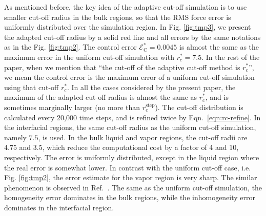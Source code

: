 \documentclass[preprint]{revtex4}
\begin{document}
As mentioned before, the key idea of the adaptive cut-off simulation
is to use smaller cut-off
radius in the bulk regions, so that the RMS force error is uniformly
distributed over the simulation region. In Fig. \ref{fig:tmp3}, we
present the adapted cut-off radius by a solid red line and all errors
by the same notations as in the Fig. \ref{fig:tmp2}. The control error
$\mathcal E^\ast_{\textrm{C}} = 0.0045$ is almost the same as the maximum
error in the uniform cut-off simulation with $r_c^\ast=7.5$.
{
  In the rest of the paper, when we mention that ``the cut-off of
  the adaptive cut-off method is $r_c^\ast$'', we mean the
  control error is the maximum error of a uniform cut-off simulation
  using that cut-off $r_c^\ast$. In all the cases considered by
  the present paper, the maximum of
  the adapted cut-off radius is almost the same as $r_c^\ast$,
  and is sometimes marginally larger (no more than $r_c^\textrm{step}$).
}
The
cut-off distribution is calculated every 20,000 time steps, and is
refined twice by Eqn.~\eqref{eqn:rc-refine}. In the interfacial
regions, the same cut-off radius as the uniform cut-off simulation,
namely $7.5$, is used.  In the bulk
liquid and vapor regions, the cut-off radii are $4.75$ and $3.5$,
which reduce the computational cost
by a factor of 4 and 10, respectively.
The error is uniformly distributed, except in the
liquid region where the real error is somewhat lower.
In contrast with the uniform
cut-off case, i.e. Fig. \ref{fig:tmp2}, the error estimate for the
vapor region is very sharp.
The similar phenomenon is observed in
Ref.~\cite{wang2011}.
The same as the uniform cut-off simulation, the
homogeneity error dominates in the bulk regions, while the
inhomogeneity error dominates in the interfacial region.
\end{document}
